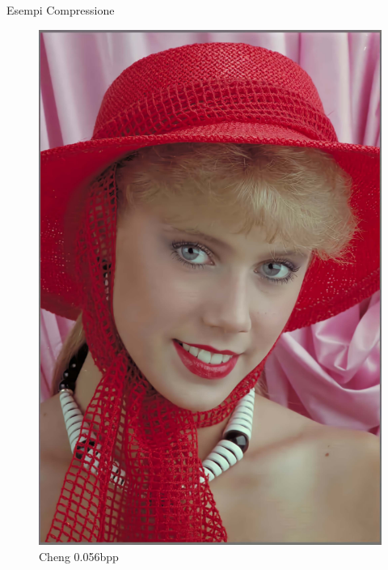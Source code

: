 \begin{frame}{Esempi Compressione}
\begin{figure}[!ht]
\begin{minipage}[]{0.13\linewidth}
                \includegraphics[width=\textwidth]{Immagini/IMAGES/cheng2020_attn_2_IMG0004.pdf}
                \caption{Cheng 0.056bpp}
                \label{fig:ExampleCheng}
            \end{minipage}
            \label{fig:ExamplesCompression}
        \end{figure}
    \end{frame}

